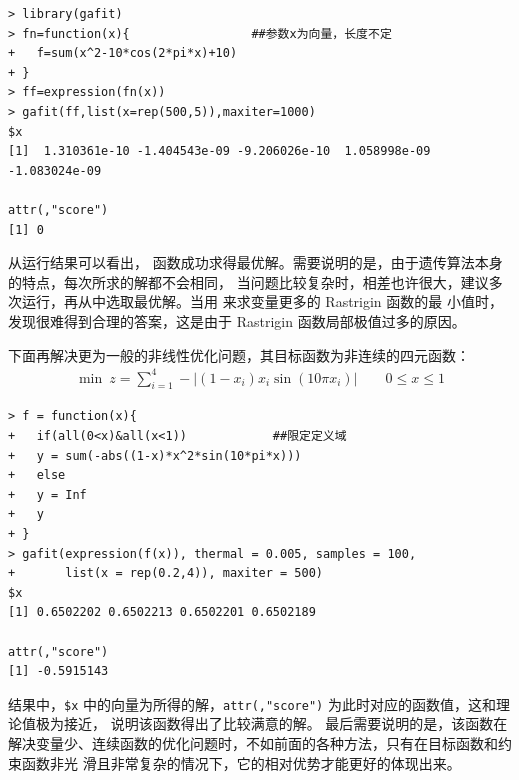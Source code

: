 \begin{Verbatim}
> library(gafit)
> fn=function(x){                 ##参数x为向量，长度不定
+   f=sum(x^2-10*cos(2*pi*x)+10)
+ }
> ff=expression(fn(x))
> gafit(ff,list(x=rep(500,5)),maxiter=1000)
$x
[1]  1.310361e-10 -1.404543e-09 -9.206026e-10  1.058998e-09 -1.083024e-09

attr(,"score")
[1] 0
\end{Verbatim}

从运行结果可以看出， 函数成功求得最优解。需要说明的是，由于遗传算法本身的特点，每次所求的解都不会相同，
当问题比较复杂时，相差也许很大，建议多次运行，再从中选取最优解。当用  来求变量更多的 Rastrigin 函数的最
小值时，发现很难得到合理的答案，这是由于 Rastrigin 函数局部极值过多的原因。


\begin{exmp}下面再解决更为一般的非线性优化问题，其目标函数为非连续的四元函数：
\[
\begin{array}{l}
\min \ z=\sum\limits_{i=1}^4 -|(1-x_i)x_i\sin (10\pi x_i)| \qquad 0\leqslant x \leqslant 1
 \end{array}
\]
\end{exmp}

\begin{Verbatim}
> f = function(x){
+   if(all(0<x)&all(x<1))            ##限定定义域
+   y = sum(-abs((1-x)*x^2*sin(10*pi*x)))
+   else
+   y = Inf
+   y
+ }
> gafit(expression(f(x)), thermal = 0.005, samples = 100,
+       list(x = rep(0.2,4)), maxiter = 500)
$x
[1] 0.6502202 0.6502213 0.6502201 0.6502189

attr(,"score")
[1] -0.5915143
\end{Verbatim}

结果中，\verb|$x| 中的向量为所得的解，\verb|attr(,"score")| 为此时对应的函数值，这和理论值极为接近，
说明该函数得出了比较满意的解。
最后需要说明的是，该函数在解决变量少、连续函数的优化问题时，不如前面的各种方法，只有在目标函数和约束函数非光
滑且非常复杂的情况下，它的相对优势才能更好的体现出来。
